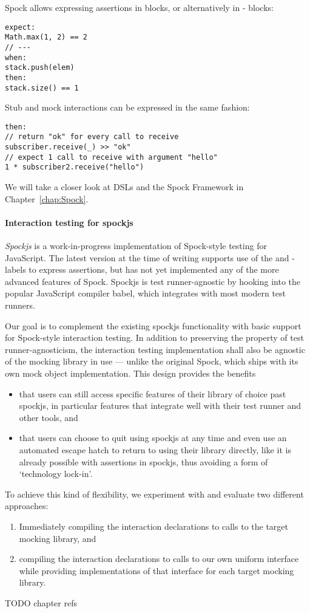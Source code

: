Spock allows expressing assertions in  blocks,
or alternatively in - blocks:
\autocite{SpockFrameworkDoc}
\begin{verbatim}
expect:
Math.max(1, 2) == 2
// ---
when:
stack.push(elem)
then:
stack.size() == 1
\end{verbatim}
Stub and mock interactions can be expressed in the same fashion:
\autocite{SpockFrameworkDoc}
\begin{verbatim}
then:
// return "ok" for every call to receive
subscriber.receive(_) >> "ok"
// expect 1 call to receive with argument "hello"
1 * subscriber2.receive("hello")
\end{verbatim}
We will take a closer look at DSLs and the Spock Framework in Chapter~\ref{chap:Spock}.

\paragraph{Interaction testing for spockjs}
\textit{Spockjs} is a work-in-progress implementation
of Spock-style testing for JavaScript.
\autocite{SpockjsGithub}
The latest version at the time of writing
supports use of the  and -
labels to express assertions,
but has not yet implemented any
of the more advanced features of Spock.
Spockjs is test runner-agnostic by
hooking into the popular JavaScript compiler babel,
which integrates with most modern test runners.
\autocite{BabelSetupDoc}

Our goal is to complement the existing spockjs functionality
with basic support for Spock-style interaction testing.
In addition to preserving the property of test runner-agnosticism,
the interaction testing implementation shall also be
agnostic of the mocking library in use ---
unlike the original Spock, which ships with its own mock object implementation.
This design provides the benefits
\begin{itemize}
  \item that users can still access specific features
    of their library of choice past spockjs,
    in particular features that integrate well with
    their test runner and other tools, and
  \item that users can choose to quit using spockjs at any time
    and even use an automated escape hatch to return to using their library directly,
    like it is already possible with assertions in spockjs,
    thus avoiding a form of `technology lock-in'.
\end{itemize}

To achieve this kind of flexibility,
we experiment with and evaluate two different approaches:
\begin{enumerate}
  \item Immediately compiling the interaction declarations
    to calls to the target mocking library, and
  \item compiling the interaction declarations
    to calls to our own uniform interface
    while providing implementations
    of that interface
    for each target mocking library.
\end{enumerate}

TODO chapter refs
